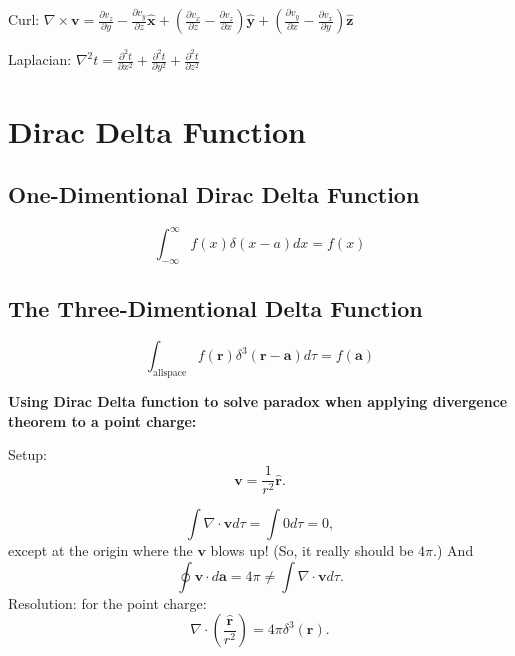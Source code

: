 \documentclass{report}
\newcommand{\unitx}{\mathbf{\hat{x}}}
\newcommand{\unity}{\mathbf{\hat{y}}}
\newcommand{\unitz}{\mathbf{\hat{z}}}
\begin{document}
\noindent Curl: $\displaystyle \nabla \times \mathbf{v} = \frac{\partial v_z}{\partial y} - \frac{\partial v_y}{\partial z}\unitx  + \left( \frac{\partial v_x}{\partial z} - \frac{\partial v_z}{\partial x} \right)\unity + \left( \frac{\partial v_y}{\partial x} - \frac{\partial v_x}{\partial y} \right)\unitz$

\noindent Laplacian: $\displaystyle \nabla^2 t = \frac{\partial^2 t}{\partial x^2}  + \frac{\partial^2 t}{\partial y^2} + \frac{\partial^2 t}{\partial z^2}$


\section{Dirac Delta Function}
\subsection{One-Dimentional Dirac Delta Function}
\begin{equation}
    \int_{-\infty}^\infty f(x)\delta(x-a) dx = f(x)
\end{equation}
\subsection{The Three-Dimentional Delta Function}
\begin{equation}
    \int_{\mathrm{all space}} f(\mathbf{r})\delta^3(\mathbf{r} - \mathbf{a})d\tau = f(\mathbf{a})
\end{equation}


\noindent \textbf{Using Dirac Delta function to solve paradox when applying divergence theorem to a point charge:}


\noindent Setup: 
\begin{equation}
    \mathbf{v} = \frac{1}{r^2} \mathbf{\hat{r}}.
\end{equation}

\begin{equation}
    \int \nabla \cdot \mathbf{v} d \tau = \int 0 d \tau = 0,
\end{equation}
except at the origin where the $\mathbf{v}$ blows up! (So, it really should be $4\pi$.) And 
\begin{equation}
    \oint \mathbf{v} \cdot d\mathbf{a} = 4 \pi \neq  \int \nabla \cdot \mathbf{v} d \tau.
\end{equation}
Resolution: for the point charge: 
\begin{equation}
    \nabla \cdot \left( \frac{\mathbf{\hat{r}}}{r^2} \right) = 4\pi \delta^3(\mathbf{r}).
\end{equation}
\end{document}
